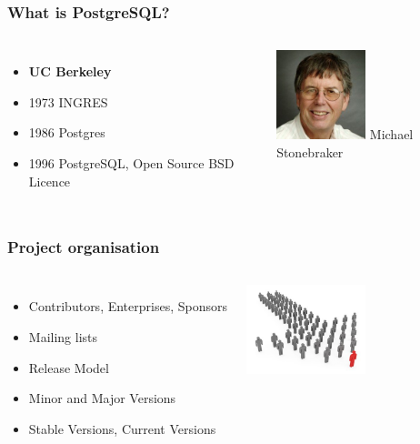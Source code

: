 \documentclass{beamer}
\begin{document}
\begin{frame}[fragile]
  \frametitle{What is PostgreSQL?}


\begin{columns}[c]

  \begin{itemize}
  \item \textbf{UC Berkeley}
  \item 1973 INGRES
  \item 1986 Postgres
  \item 1996 PostgreSQL, Open Source BSD Licence
  \end{itemize}

\begin{center}
  \includegraphics[height=7em]{021909_Stonebraker_Michael_250_large.jpg}
  \linebreak
  Michael Stonebraker
\end{center}
\end{columns}
\end{frame}

\begin{frame}[fragile]
  \frametitle{Project organisation}


\begin{columns}[c]

  \begin{itemize}
  \item Contributors, Enterprises, Sponsors
  \item Mailing lists
  \item Release Model
  \item Minor and Major Versions
  \item Stable Versions, Current Versions
  \end{itemize}

\begin{center}
  \includegraphics[height=7em]{elite_contributors.jpg}
\end{center}
\end{columns}
\end{frame}
\end{document}
